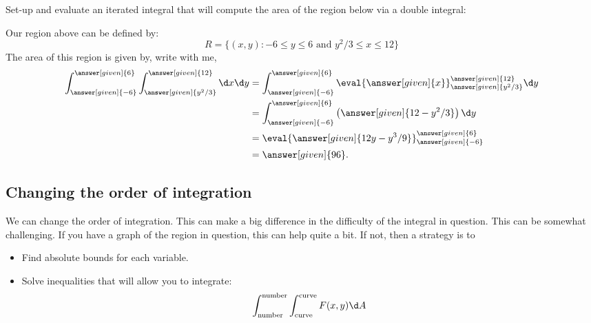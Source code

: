 \documentclass{ximera}
\begin{document}
\begin{example}
  Set-up and evaluate an iterated integral that will compute the area
  of the region below via a double integral:
  \begin{image}
  \end{image}
  \begin{explanation}
    Our region above can be defined by:
    \[
    R=\{(x,y):\text{$-6\leq y\leq 6$ and $y^2/3\leq x\leq 12$}\}
    \]
    The area of this region is given by, write with me, 
    \begin{align*}
      \int_{\answer[given]{-6}}^{\answer[given]{6}}\int_{\answer[given]{y^2/3}}^{\answer[given]{12}}\d x \d y &= \int_{\answer[given]{-6}}^{\answer[given]{6}} \eval{\answer[given]{x}}_{\answer[given]{y^2/3}}^{\answer[given]{12}} \d y\\
      &=  \int_{\answer[given]{-6}}^{\answer[given]{6}} \left(\answer[given]{12-y^2/3}\right) \d y\\
      &=  \eval{\answer[given]{12y-y^3/9}}_{\answer[given]{-6}}^{\answer[given]{6}}\\
      &= \answer[given]{96}. 
    \end{align*}
  \end{explanation}
\end{example}

\subsection{Changing the order of integration}

We can change the order of integration. This can make a big difference
in the difficulty of the integral in question. This can be somewhat
challenging. If you have a graph of the region in question, this can
help quite a bit. If not, then a strategy is to
\begin{itemize}
\item Find absolute bounds for each variable.
\item Solve inequalities that will allow you to integrate:
  \[
  \int_{\text{number}}^{\text{number}}\int_{\text{curve}}^{\text{curve}} F(x,y) \d A
  \]
\end{itemize}
\end{document}
